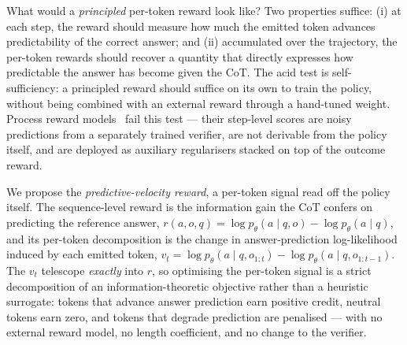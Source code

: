 \documentclass{article}
\begin{document}
What would a \emph{principled} per-token reward look like? Two
properties suffice: (i) at each step, the reward should measure how
much the emitted token advances predictability of the correct answer;
and (ii) accumulated over the trajectory, the per-token rewards should
recover a quantity that directly expresses how predictable the answer
has become given the CoT. The acid test is self-sufficiency: a
principled reward should suffice on its own to train the policy,
without being combined with an external reward through a hand-tuned
weight. Process reward
models~\citep{lightman2023letsverify, wang2024mathshepherd,
cui2025prime, setlur2024rewardingprogress} fail this test --- their
step-level scores are noisy predictions from a separately trained
verifier, are not derivable from the policy itself, and are deployed as
auxiliary regularisers stacked on top of the outcome reward.

We propose the \emph{predictive-velocity reward}, a per-token signal read
off the policy itself. The sequence-level reward is the information
gain the CoT confers on predicting the reference answer,
\(r(a, o, q) = \log p_\theta(a \mid q, o) - \log p_\theta(a \mid q)\),
and its per-token decomposition is the change in answer-prediction
log-likelihood induced by each emitted token,
\(v_t = \log p_\theta(a \mid q, o_{1:t}) - \log p_\theta(a \mid q, o_{1:t-1})\).
The \(v_t\) telescope \emph{exactly} into \(r\), so optimising the
per-token signal is a strict decomposition of an information-theoretic
objective rather than a heuristic surrogate: tokens that advance answer
prediction earn positive credit, neutral tokens earn zero, and tokens
that degrade prediction are penalised --- with no external reward model,
no length coefficient, and no change to the verifier.
\end{document}
